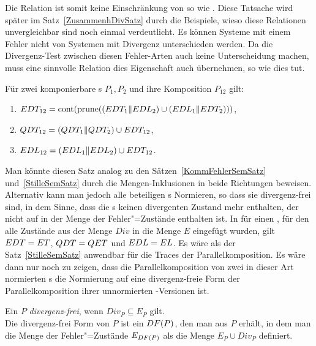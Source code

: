 Die Relation \DRel{} ist somit keine Einschränkung von \ERel{} so wie \QRel{}.
Diese Tatsache wird später im Satz~\ref{ZusammenhDivSatz} durch die Beispiele,
wieso diese Relationen unvergleichbar sind noch einmal verdeutlicht.
Es können Systeme mit einem Fehler nicht von Systemen mit Divergenz
unterschieden werden. Da die Divergenz-Test zwischen diesen \glqq
Fehler-Arten\grqq{} auch keine Unterscheidung machen, muss eine sinnvolle
Relation dies Eigenschaft auch übernehmen, so wie \DRel{} dies tut.

\begin{Satz}
  \label{DivSemSatz}
  Für zwei komponierbare \MEIO{}s $P_1,P_2$ und ihre Komposition $P_{12}$ gilt:
  \begin{enumerate}
    \item $EDT _{12} =\mathrm{cont} (\mathrm{prune} ((EDT _1\|EDL _2)\cup (EDL _1\|EDT
      _2)))$,
    \item $QDT _{12} =(QDT _1\|QDT _2)\cup EDT _{12}$,
    \item $EDL _{12} =(EDL _1\|EDL _2)\cup EDT _{12}$.
  \end{enumerate}
\end{Satz}

Man könnte diesen Satz analog zu den Sätzen~\ref{KommFehlerSemSatz}
und~\ref{StilleSemSatz} durch die Mengen-Inklusionen in beide Richtungen
beweisen. Alternativ kann man jedoch alle beteiligen \MEIO{}s Normieren, so
dass sie divergenz-frei sind, in dem Sinne, dass die \MEIO{}s keinen
divergenten Zustand mehr enthalten, der nicht auf in der Menge der
Fehler"=Zustände enthalten ist. In für einen \MEIO{}, für den alle Zustände aus
der Menge $Div$ in die Menge $E$ eingefügt wurden, gilt $EDT = ET$, $QDT =
QET$ und $EDL = EL$. Es wäre als der Satz~\ref{StilleSemSatz} anwendbar für
die Traces der Parallelkomposition. Es wäre dann nur noch zu zeigen, dass die
Parallelkomposition von zwei in dieser Art normierten \MEIO{}s die Normierung
auf eine divergenz-freie Form der Parallelkomposition ihrer unnormierten
\MEIO{}-Versionen ist.

\begin{Def}
  \label{DivNormDef}
  Ein \MEIO{} $P$ \emph{divergenz-frei}, wenn $Div _P \subseteq E_P$ gilt.\\
  Die divergenz-frei Form von $P$ ist ein \MEIO{} $DF (P)$, den man aus $P$
  erhält, in dem man die Menge der Fehler"=Zustände $E_{DF (P)}$ als die Menge
  $E_P \cup Div _P$ definiert.
\end{Def}

